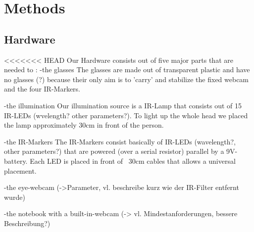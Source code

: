 \section{Methods}\label{methods}

\subsection{Hardware}
<<<<<<< HEAD
Our Hardware consists out of five major parts that are needed to :
-the glasses
The glasses are made out of transparent plastic and have no glasses (?) because their only aim is to 'carry' and stabilize the fixed webcam and the four IR-Markers.

-the illumination
Our illumination source is a IR-Lamp that consists out of 15 IR-LEDs (wvelength? other parameters?). To light up the whole head we placed the lamp approximately 30cm in front of the person.

-the IR-Markers
The IR-Markers consist basically of IR-LEDs (wavelength?, other parameters?) that are powered (over a serial resistor) parallel by a 9V-battery. Each LED is placed in front of ~30cm cables that allows a universal placement. 

-the eye-webcam 
(->Parameter, vl. beschreibe kurz wie der IR-Filter entfernt wurde)

-the notebook with a built-in-webcam 
(-> vl. Mindestanforderungen, bessere Beschreibung?)

